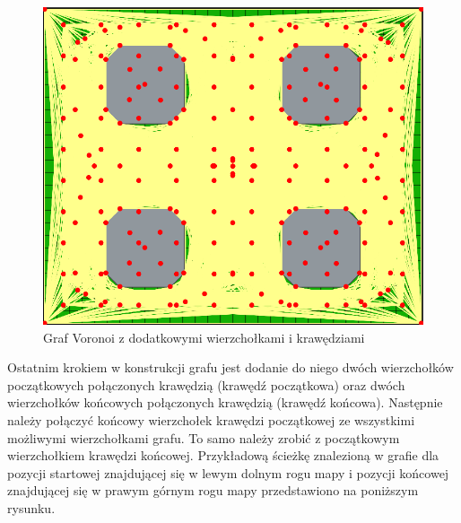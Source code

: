 \documentclass[a4paper,11pt,twoside]{report}
\theoremstyle{definition}
\begin{document}
\begin{figure}[h!]
\centering
\includegraphics[scale=0.4]{fullVoronoiGraphForExpandedMapWithExtraVertices}
\caption[Graf Voronoi z dodatkowymi wierzchołkami i krawędziami]{Graf Voronoi z dodatkowymi wierzchołkami i krawędziami}
\end{figure}

Ostatnim krokiem w konstrukcji grafu jest dodanie do niego dwóch wierzchołków początkowych połączonych krawędzią (krawędź początkowa) oraz dwóch wierzchołków końcowych połączonych krawędzią (krawędź końcowa). Następnie należy połączyć końcowy wierzchołek krawędzi początkowej ze wszystkimi możliwymi wierzchołkami grafu. To samo należy zrobić z początkowym wierzchołkiem krawędzi końcowej. Przykładową ścieżkę znalezioną w grafie dla pozycji startowej znajdującej się w lewym dolnym rogu mapy i pozycji końcowej znajdującej się w prawym górnym rogu mapy przedstawiono na poniższym rysunku.
\end{document}
